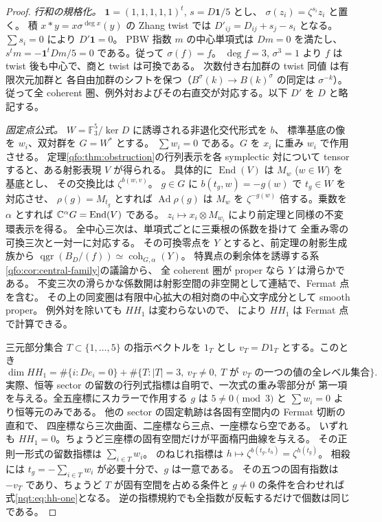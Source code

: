 \begin{proof}
\emph{行和の規格化。}
$\mathbf1=(1,1,1,1,1)^t$, $s=D\mathbf1/5$ とし、
$\sigma(z_i)=\zeta^{s_i}z_i$ と置く。
積 $x*y=x\sigma^{\deg x}(y)$ の Zhang twist では
$D'_{ij}=D_{ij}+s_j-s_i$ となる。$\sum s_i=0$ により $D'\mathbf1=0$。
PBW 指数 $m$ の中心単項式は $Dm=0$ を満たし、
$s^t m=-\mathbf1^tDm/5=0$ である。従って $\sigma(f)=f$。
$\deg f=3$, $\sigma^3=1$ より $f$ は twist 後も中心で、商と twist は可換である。
次数付き右加群の twist 同値 \cite{TBPZhangTwist} は有限次元加群と
各自由加群のシフトを保つ（$B^\sigma(k)\to B(k)^\sigma$ の同定は $\sigma^{-k}$）。
従って全 coherent 圏、例外対およびその右直交が対応する。以下 $D'$
を $D$ と略記する。

\emph{固定点公式。}
$W=\mathbb F_3^5/\ker D$ に誘導される非退化交代形式を $b$、
標準基底の像を $w_i$、双対群を $G=W^*$ とする。
$\sum w_i=0$ である。$G$ を $x_i$ に重み $w_i$ で作用させる。
定理\ref{qfo:thm:obstruction}の行列表示を各 symplectic 対について
tensor すると、ある射影表現 $V$ が得られる。
具体的に $\operatorname{End}(V)$ は $M_w$ ($w\in W$) を基底とし、
その交換比は $\zeta^{b(w,v)}$。
$g\in G$ に $b(t_g,w)=-g(w)$ で $t_g\in W$ を対応させ、
$\rho(g)=M_{t_g}$ とすれば $\operatorname{Ad}\rho(g)$ は $M_w$ を
$\zeta^{-g(w)}$ 倍する。乗数を $\alpha$ とすれば
$\mathbb C^\alpha G=\operatorname{End}(V)$ である。
$z_i\mapsto x_i\otimes M_{w_i}$ により前定理と同様の不変環表示を得る。
全中心三次は、単項式ごとに三乗根の係数を掛けて
全重み零の可換三次と一対一に対応する。
その可換零点を $Y$ とすると、前定理の射影生成族から
$\operatorname{qgr}(B_D/(f))\simeq\operatorname{coh}_{G,\alpha}(Y)$。
特異点の剰余体を誘導する系\ref{qfo:cor:central-family}の議論から、
全 coherent 圏が proper なら $Y$ は滑らかである。
不変三次の滑らかな係数開は射影空間の非空開として連結で、Fermat 点を含む。
その上の同変圏は有限中心拡大の相対商の中心文字成分として smooth proper。
例外対を除いても $HH_1$ は変わらないので、
\cite[Theorem~3.5]{QFOPerryHodge} により $HH_1$ は Fermat 点で計算できる。

三元部分集合 $T\subset\{1,\ldots,5\}$ の指示ベクトルを $1_T$ とし
$v_T=D1_T$ とする。このとき
\begin{equation}\label{nqt:eq:hh-one}
 \dim HH_1=\#\{i:De_i=0\}
 +\#\{T:|T|=3,\ v_T\ne0,\ T\text{ が }v_T\text{ の一つの値の全レベル集合}\}.
\end{equation}
実際、恒等 sector の留数の行列式指標は自明で、一次式の重み零部分が
第一項を与える。全五座標にスカラーで作用する $g$ は
$5\ne0\pmod3$ と $\sum w_i=0$ より恒等元のみである。
他の sector の固定軌跡は各固有空間内の Fermat 切断の直和で、
四座標なら三次曲面、二座標なら三点、一座標なら空である。
いずれも $HH_1=0$。ちょうど三座標の固有空間だけが平面楕円曲線を与える。
その正則一形式の留数指標は $\sum_{i\in T} w_i$。
\cite[Theorem~6]{QFOBaranovskyPetrov}のねじれ指標は
$h\mapsto\zeta^{b(t_g,t_h)}=\zeta^{h(t_g)}$。
相殺には $t_g=-\sum_{i\in T}w_i$ が必要十分で、$g$ は一意である。
その五つの固有指数は $-v_T$ であり、ちょうど $T$ が固有空間を占める条件と
$g\ne0$ の条件を合わせれば式\eqref{nqt:eq:hh-one}となる。
逆の指標規約でも全指数が反転するだけで個数は同じである。


\end{proof}
